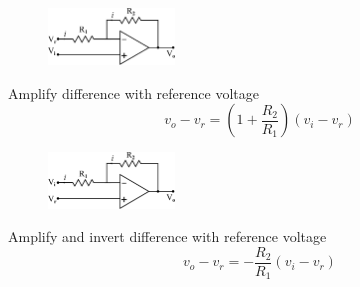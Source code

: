 \documentclass[a4 paper]{article}
\numberwithin{equation}{section}
\newcommand{\0}{\mathbf{0}}
\begin{document}
\begin{paracol}{2}
\begin{leftcolumn*}

\begin{figure}[ht]
  \label{Non-inverting Amplifier}
  \centering
  \includegraphics[width=0.3\textwidth]{./images/non-inverting}
\end{figure}

Amplify difference with reference voltage
\begin{equation}
v_o-v_r = (1+\frac{R_2}{R_1})(v_i-v_r)
\end{equation}


\end{leftcolumn*}

\begin{rightcolumn}

\begin{figure}[ht]
  \label{Inverting Amplifier}
  \centering
  \includegraphics[width=0.3\textwidth]{./images/inverting}
\end{figure}
{Amplify and invert difference with reference voltage}
\begin{equation}
v_o-v_r = -\frac{R_2}{R_1}(v_i-v_r)
\end{equation}

\end{rightcolumn}
\end{paracol}














%
%
\end{document}
